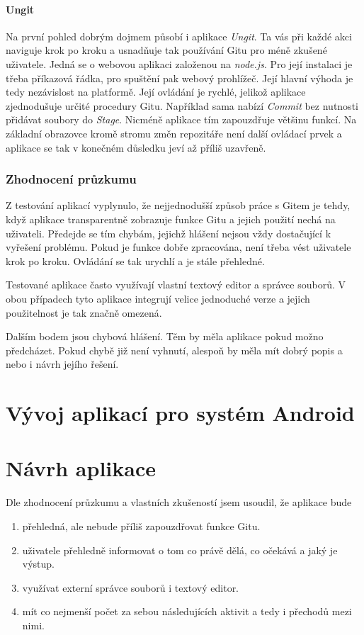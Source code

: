         \subsubsection{Ungit}
        Na první pohled dobrým dojmem působí i aplikace \emph{Ungit}. Ta vás při každé akci naviguje krok po kroku a usnadňuje tak používání Gitu pro méně zkušené uživatele. Jedná se o webovou aplikaci založenou na \emph{node.js}. Pro její instalaci je třeba příkazová řádka, pro spuštění pak webový prohlížeč. Její hlavní výhoda je tedy nezávislost na platformě. Její ovládání je rychlé, jelikož aplikace zjednodušuje určité procedury Gitu. Například sama nabízí \emph{Commit} bez nutnosti přidávat soubory do \emph{Stage}. Nicméně aplikace tím zapouzdřuje většinu funkcí. Na základní obrazovce kromě stromu změn repozitáře není další ovládací prvek a aplikace se tak v konečném důsledku jeví až příliš uzavřeně.

        \subsection{Zhodnocení průzkumu}
        Z testování aplikací vyplynulo, že nejjednodušší způsob práce s Gitem je tehdy, když aplikace transparentně zobrazuje funkce Gitu a jejich použití nechá na uživateli. Předejde se tím chybám, jejichž hlášení nejsou vždy dostačující k vyřešení problému. Pokud je funkce dobře zpracována, není třeba vést uživatele krok po kroku. Ovládání se tak urychlí a je stále přehledné.

        Testované aplikace často využívají vlastní textový editor a správce souborů. V obou případech tyto aplikace integrují velice jednoduché verze a jejich použitelnost je tak značně omezená.

        Dalším bodem jsou chybová hlášení. Těm by měla aplikace pokud možno předcházet. Pokud chybě již není vyhnutí, alespoň by měla mít dobrý popis a nebo i návrh jejího řešení.

\chapter{Vývoj aplikací pro systém Android}

\chapter{Návrh aplikace}
    Dle zhodnocení průzkumu a vlastních zkušeností jsem usoudil, že aplikace bude
    \begin{enumerate}
        \item přehledná, ale nebude příliš zapouzdřovat funkce Gitu.
        \item uživatele přehledně informovat o tom co právě dělá, co očekává a jaký je výstup.
        \item využívat externí správce souborů i textový editor.
        \item mít co nejmenší počet za sebou následujících aktivit a tedy i přechodů mezi nimi.
    \end{enumerate}

